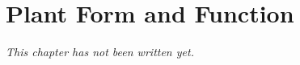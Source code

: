 \chapter{Plant Form and Function}\label{ch:b1:plant-form}


\emph{This chapter has not been written yet.}
